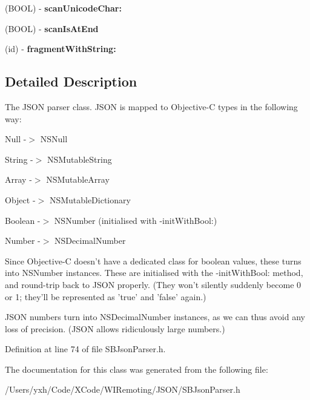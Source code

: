 \begin{DoxyCompactItemize}
\item 
\hypertarget{interface_s_b_json_parser_aea014e27d084f4d34e3025089c62aa74}{
(BOOL) -\/ {\bfseries scanUnicodeChar:}}
\label{interface_s_b_json_parser_aea014e27d084f4d34e3025089c62aa74}

\item 
\hypertarget{interface_s_b_json_parser_a968fa7546f80d05c2d3d53fe57a2cece}{
(BOOL) -\/ {\bfseries scanIsAtEnd}}
\label{interface_s_b_json_parser_a968fa7546f80d05c2d3d53fe57a2cece}

\item 
\hypertarget{interface_s_b_json_parser_af19e33c5d77f71c4a172661545bb2299}{
(id) -\/ {\bfseries fragmentWithString:}}
\label{interface_s_b_json_parser_af19e33c5d77f71c4a172661545bb2299}

\end{DoxyCompactItemize}


\subsection{Detailed Description}
The JSON parser class. JSON is mapped to Objective-\/C types in the following way:

\begin{DoxyItemize}
\item Null -\/$>$ NSNull \item String -\/$>$ NSMutableString \item Array -\/$>$ NSMutableArray \item Object -\/$>$ NSMutableDictionary \item Boolean -\/$>$ NSNumber (initialised with -\/initWithBool:) \item Number -\/$>$ NSDecimalNumber\end{DoxyItemize}
Since Objective-\/C doesn't have a dedicated class for boolean values, these turns into NSNumber instances. These are initialised with the -\/initWithBool: method, and round-\/trip back to JSON properly. (They won't silently suddenly become 0 or 1; they'll be represented as 'true' and 'false' again.)

JSON numbers turn into NSDecimalNumber instances, as we can thus avoid any loss of precision. (JSON allows ridiculously large numbers.) 

Definition at line 74 of file SBJsonParser.h.

The documentation for this class was generated from the following file:\begin{DoxyCompactItemize}
\item 
/Users/yxh/Code/XCode/WIRemoting/JSON/SBJsonParser.h\end{DoxyCompactItemize}
